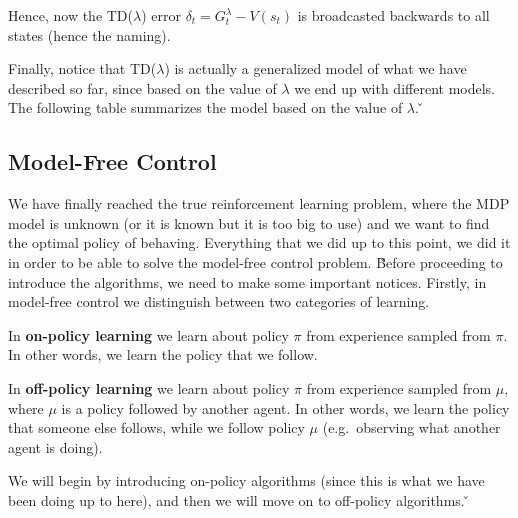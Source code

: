 Hence, now the TD($\lambda$) error $\delta_t = G_t^{\lambda} - V(s_t) $ is broadcasted backwards to all states (hence
the naming).

\vspace{10pt}


Finally, notice that TD($\lambda$) is actually a generalized model of what we have described so far, since based on
the value of $\lambda$ we end up with different models. The following table summarizes the model based on the value
of $\lambda$. \v


\subsection{Model-Free Control}

We have finally reached the true reinforcement learning problem, where the MDP model is unknown (or it is known but
it is too big to use) and we want to find the optimal policy of behaving. Everything that we did up to this point, we
did it in order to be able to solve the model-free control problem. \v

Before proceeding to introduce the algorithms, we need to make some important notices. Firstly, in model-free control
we distinguish between two categories of learning.

In \textbf{on-policy learning} we learn about policy $\pi$ from experience sampled from $\pi$. In other words, we
learn the policy that we follow.
\ed

In \textbf{off-policy learning} we learn about policy $\pi$ from experience sampled from $\mu$, where $\mu$ is a
policy followed by another agent. In other words, we learn the policy that someone else follows, while we follow
policy $\mu$ (e.g.\ observing what another agent is doing).
\ed

We will begin by introducing on-policy algorithms (since this is what we have been doing up to here), and then we
will move on to off-policy algorithms. \v

